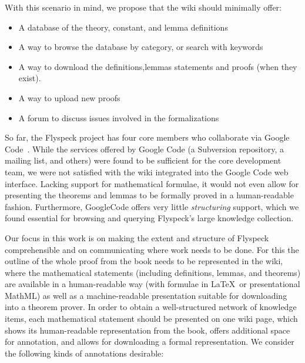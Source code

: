 With this scenario in mind, we propose that the wiki should minimally offer: 

\begin{itemize} 
\item A database of the theory, constant, and lemma definitions 
\item A way to browse the database by category, or search with keywords 
\item A way to download the definitions,lemmas statements and proofs (when they exist). 
\item A way to upload new proofs 
\item A forum to discuss issues involved in the formalizations 
\end{itemize} 

So far, the Flyspeck project has four core members who collaborate via
Google Code~\cite{website:GoogleCode}.  While the services offered by
Google Code (a Subversion repository, a mailing list, and others) were
found to be sufficient for the core development team, we were not
satisfied with the wiki integrated into the Google Code web interface.
Lacking support for mathematical formulae, it would not even allow for
presenting the theorems and lemmas to be formally proved in a
human-readable fashion.  Furthermore, GoogleCode offers very
little \emph{structuring} support, which we found essential for browsing and
querying Flyspeck's large knowledge collection.

Our focus in this work is on making the extent and structure of
Flyspeck comprehensible and on communicating where work needs to be
done.  For this the outline of the whole proof from the
book\cite{Hales:2007:FlyspeckBook} needs to be represented in the
wiki, where the mathematical statements (including definitions,
lemmas, and theorems) are available in a human-readable way (with
formulae in \LaTeX\ or presentational MathML) as well as a
machine-readable presentation suitable for downloading into a theorem
prover.  In order to obtain a well-structured network of knowledge
items, each mathematical statement should be presented on one wiki
page, which shows its human-readable representation from the book,
offers additional space for annotation, and allows for downloading a
formal representation.  We consider the following kinds of annotations
desirable:

